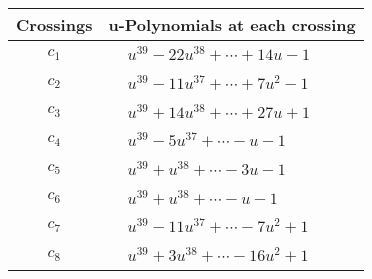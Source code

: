 \documentclass[1p]{elsarticle_modified}
\theoremstyle{definition}
\begin{document}
\begin{tabular}{m{50pt}|m{274pt}}
Crossings & \hspace{64pt}u-Polynomials at each crossing \\
\hline $$\begin{aligned}c_{1}\end{aligned}$$&$\begin{aligned}
&u^{39}-22 u^{38}+\cdots+14 u-1
\end{aligned}$\\
\hline $$\begin{aligned}c_{2}\end{aligned}$$&$\begin{aligned}
&u^{39}-11 u^{37}+\cdots+7 u^2-1
\end{aligned}$\\
\hline $$\begin{aligned}c_{3}\end{aligned}$$&$\begin{aligned}
&u^{39}+14 u^{38}+\cdots+27 u+1
\end{aligned}$\\
\hline $$\begin{aligned}c_{4}\end{aligned}$$&$\begin{aligned}
&u^{39}-5 u^{37}+\cdots- u-1
\end{aligned}$\\
\hline $$\begin{aligned}c_{5}\end{aligned}$$&$\begin{aligned}
&u^{39}+u^{38}+\cdots-3 u-1
\end{aligned}$\\
\hline $$\begin{aligned}c_{6}\end{aligned}$$&$\begin{aligned}
&u^{39}+u^{38}+\cdots- u-1
\end{aligned}$\\
\hline $$\begin{aligned}c_{7}\end{aligned}$$&$\begin{aligned}
&u^{39}-11 u^{37}+\cdots-7 u^2+1
\end{aligned}$\\
\hline $$\begin{aligned}c_{8}\end{aligned}$$&$\begin{aligned}
&u^{39}+3 u^{38}+\cdots-16 u^2+1
\end{aligned}$\\

\end{tabular}
\end{document}

